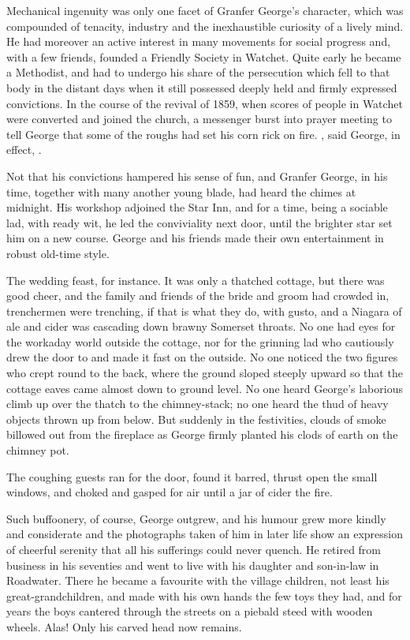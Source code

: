 Mechanical ingenuity was only one facet of Granfer George's character, which was compounded of tenacity, industry and the inexhaustible curiosity of a lively mind. He had moreover an active interest in many movements for social progress and, with a few friends, founded a Friendly Society in Watchet. Quite early he became a Methodist, and had to undergo his share of the persecution which fell to that body in the distant days when it still possessed deeply held and firmly expressed convictions. In the course of the revival of 1859, when scores of people in Watchet were converted and joined the church, a messenger burst into  prayer meeting to tell George that some of the roughs had set his corn rick on fire. , said George, in effect, .

Not that his convictions hampered his sense of fun, and Granfer George, in his time, together with many another young blade, had heard the chimes at midnight. His workshop adjoined the Star Inn, and for a time, being a sociable lad, with ready wit, he led the conviviality next door, until the brighter star set him on a new course. George and his friends made their own entertainment in robust old-time style.

The wedding feast, for instance. It was only a thatched cottage, but there was good cheer, and the family and friends of the bride and groom had crowded in, trenchermen were trenching, if that is what they do, with gusto, and a Niagara of ale and cider was cascading down brawny Somerset throats. No one had eyes for the workaday world outside the cottage, nor for the grinning lad who cautiously drew the door to and made it fast on the outside. No one noticed the two figures who crept round to the back, where the ground sloped steeply upward so that the cottage eaves came almost down to ground level. No one heard George's laborious climb up over the thatch to the chimney-stack; no one heard the thud of heavy objects thrown up from below. But suddenly in the festivities, clouds of smoke billowed out from the fireplace as George firmly planted his clods of earth on the chimney pot.

The coughing guests ran for the door, found it barred, thrust open the small windows, and choked and gasped for air until a jar of cider  the fire.

Such buffoonery, of course, George outgrew, and his humour grew more kindly and considerate and the photographs taken of him in later life show an expression of cheerful serenity that all his sufferings could never quench. He retired from business in his seventies and went to live with his daughter and son-in-law in Roadwater. There he became a favourite with the village children, not least his great-grandchildren, and made with his own hands the few toys they had, and for years the boys cantered through the streets on a piebald steed with wooden wheels. Alas! Only his carved head now remains.

